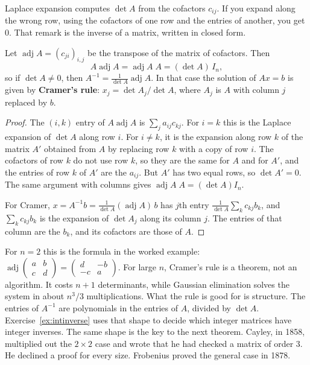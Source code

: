 Laplace expansion computes $\det A$ from the cofactors $c_{ij}$. If you expand along the wrong row, using the cofactors of one row and the entries of another, you get $0$. That remark is the inverse of a matrix, written in closed form.

\begin{proposition}\label{prop:adjugate}
Let $\operatorname{adj}A=(c_{ji})_{i,j}$ be the transpose of the matrix of cofactors. Then
\[
A\operatorname{adj}A=\operatorname{adj}A\;A=(\det A)\,I_n ,
\]
so if $\det A\ne0$, then $A^{-1}=\frac1{\det A}\operatorname{adj}A$. In that case the solution of $Ax=b$ is given by \textbf{Cramer's rule}: $x_j=\det A_j/\det A$, where $A_j$ is $A$ with column $j$ replaced by $b$.
\end{proposition}
\begin{proof}
The $(i,k)$ entry of $A\operatorname{adj}A$ is $\sum_ja_{ij}c_{kj}$. For $i=k$ this is the Laplace expansion of $\det A$ along row $i$. For $i\ne k$, it is the expansion along row $k$ of the matrix $A'$ obtained from $A$ by replacing row $k$ with a copy of row $i$. The cofactors of row $k$ do not use row $k$, so they are the same for $A$ and for $A'$, and the entries of row $k$ of $A'$ are the $a_{ij}$. But $A'$ has two equal rows, so $\det A'=0$. The same argument with columns gives $\operatorname{adj}A\;A=(\det A)I_n$.

For Cramer, $x=A^{-1}b=\frac1{\det A}(\operatorname{adj}A)\,b$ has $j$th entry $\frac1{\det A}\sum_kc_{kj}b_k$, and $\sum_kc_{kj}b_k$ is the expansion of $\det A_j$ along its column $j$. The entries of that column are the $b_k$, and its cofactors are those of $A$.
\end{proof}

For $n=2$ this is the formula in the worked example: $\operatorname{adj}\begin{pmatrix}a&b\\c&d\end{pmatrix}=\begin{pmatrix}d&-b\\-c&a\end{pmatrix}$. For large $n$, Cramer's rule is a theorem, not an algorithm. It costs $n+1$ determinants, while Gaussian elimination solves the system in about $n^3/3$ multiplications. What the rule is good for is structure. The entries of $A^{-1}$ are polynomials in the entries of $A$, divided by $\det A$. Exercise~\ref{ex:intinverse} uses that shape to decide which integer matrices have integer inverses. The same shape is the key to the next theorem. Cayley, in 1858, multiplied out the $2\times2$ case and wrote that he had checked a matrix of order $3$. He declined a proof for every size. Frobenius proved the general case in 1878.

